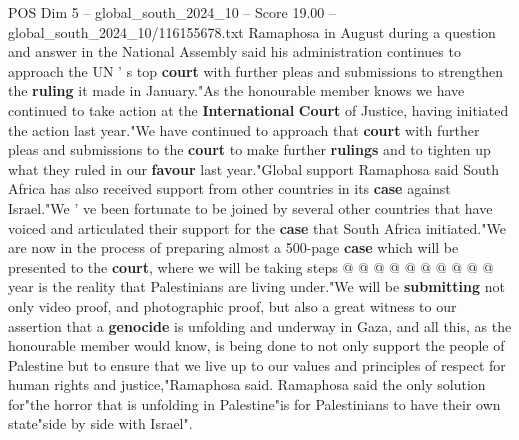 \begin{textsample}{POS Dim 5 – global\_south\_2024\_10 – Score 19.00 – global\_south\_2024\_10/116155678.txt}
Ramaphosa in August during a question and answer in the National Assembly said his administration continues to approach the UN ' s top \textbf{court} with further pleas and submissions to strengthen the \textbf{ruling} it made in January."As the honourable member knows we have continued to take action at the \textbf{International} \textbf{Court} of Justice, having initiated the action last year."We have continued to approach that \textbf{court} with further pleas and submissions to the \textbf{court} to make further \textbf{rulings} and to tighten up what they ruled in our \textbf{favour} last year."Global support Ramaphosa said South Africa has also received support from other countries in its \textbf{case} against Israel."We ' ve been fortunate to be joined by several other countries that have voiced and articulated their support for the \textbf{case} that South Africa initiated."We are now in the process of preparing almost a 500-page \textbf{case} which will be presented to the \textbf{court}, where we will be taking steps @ @ @ @ @ @ @ @ @ @ year is the reality that Palestinians are living under."We will be \textbf{submitting} not only video proof, and photographic proof, but also a great witness to our assertion that a \textbf{genocide} is unfolding and underway in Gaza, and all this, as the honourable member would know, is being done to not only support the people of Palestine but to ensure that we live up to our values and principles of respect for human rights and justice,"Ramaphosa said.
Ramaphosa said the only solution for"the horror that is unfolding in Palestine"is for Palestinians to have their own state"side by side with Israel".

\end{textsample}
